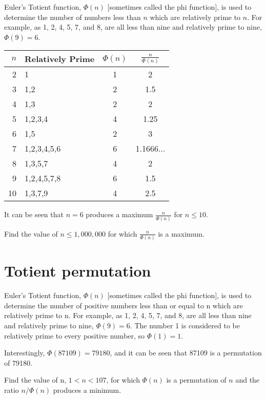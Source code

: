 Euler's Totient function, $\Phi (n)$ [sometimes called the phi function], is used to determine the number of numbers less than $n$ which are relatively prime to $n$. For example, as 1, 2, 4, 5, 7, and 8, are all less than nine and relatively prime to nine, $\Phi(9)=6$.
\begin{center}
    \begin{tabular}{|r|l|c|c|}
        \hline
        $n$ & Relatively Prime & $\Phi(n)$ & $\frac{n}{\Phi(n)}$\\
        \hline
        2 & 1 & 1 & 2\\
        \hline
        3 & 1,2 & 2 & 1.5\\
        \hline
        4 & 1,3 & 2 & 2\\
        \hline
        5 & 1,2,3,4 & 4 & 1.25\\
        \hline
        6 & 1,5 & 2 & 3\\
        \hline
        7 & 1,2,3,4,5,6 & 6 & 1.1666...\\
        \hline
        8 & 1,3,5,7 & 4 & 2\\
        \hline
        9 & 1,2,4,5,7,8 & 6 & 1.5\\
        \hline
        10 & 1,3,7,9 & 4 & 2.5\\
        \hline
    \end{tabular}
\end{center}


It can be seen that $n=6$ produces a maximum $\frac{n}{\Phi(n)}$ for $n \leqslant 10$.

Find the value of $n \leqslant 1,000,000$ for which $\frac{n}{\Phi(n)}$ is a maximum.


\section{Totient permutation} \label{pb.070}

Euler's Totient function, $\Phi(n)$ [sometimes called the phi function], is used to determine the number of positive numbers less than or equal to n which are relatively prime to n. For example, as 1, 2, 4, 5, 7, and 8, are all less than nine and relatively prime to nine, $\Phi(9)=6$.
The number 1 is considered to be relatively prime to every positive number, so $\Phi(1)=1$.

Interestingly, $\Phi(87109)=79180$, and it can be seen that 87109 is a permutation of 79180.

Find the value of n, $1 < n < 107$, for which $\Phi(n)$ is a permutation of $n$ and the ratio $n/\Phi(n)$ produces a minimum.


